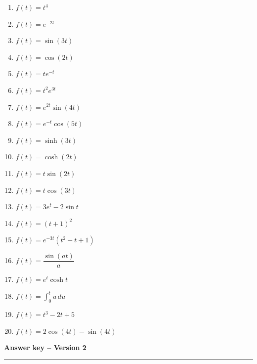 \documentclass[11pt,a4paper]{article}
\newcommand{\smallworkspace}{\vspace{1.6cm}}
\begin{document}
\begin{enumerate}
    \item $f(t)=t^4$\smallworkspace
    \item $f(t)=e^{-2t}$\smallworkspace
    \item $f(t)=\sin(3t)$\smallworkspace
    \item $f(t)=\cos(2t)$\smallworkspace
    \item $f(t)=t e^{-t}$\smallworkspace
    \item $f(t)=t^2 e^{3t}$\smallworkspace
    \item $f(t)=e^{2t}\sin(4t)$\smallworkspace
    \item $f(t)=e^{-t}\cos(5t)$\smallworkspace
    \item $f(t)=\sinh(3t)$\smallworkspace
    \item $f(t)=\cosh(2t)$\smallworkspace
    \item $f(t)=t\sin(2t)$\smallworkspace
    \item $f(t)=t\cos(3t)$\smallworkspace
    \item $f(t)=3e^t-2\sin t$\smallworkspace
    \item $f(t)=(t+1)^2$\smallworkspace
    \item $f(t)=e^{-3t}(t^2-t+1)$\smallworkspace
    \item $f(t)=\dfrac{\sin(at)}{a}$\smallworkspace
    \item $f(t)=e^t\cosh t$\smallworkspace
    \item $f(t)=\displaystyle \int_0^t u\,du$\smallworkspace
    \item $f(t)=t^3-2t+5$\smallworkspace
    \item $f(t)=2\cos(4t)-\sin(4t)$\smallworkspace
\end{enumerate}

\newpage
\begin{center}
    {\Large \textbf{Answer key -- Version 2}}\\[0.3em]
    \rule{0.7\textwidth}{0.6pt}
\end{center}
\end{document}

